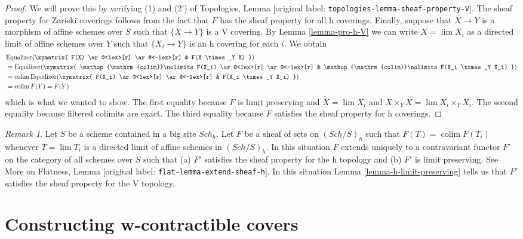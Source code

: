 \documentclass[10pt,a4paper]{article}
\theoremstyle{plain}
\theoremstyle{definition}
\theoremstyle{remark}
\newtheorem{remark}[subsection]{Remark}
\numberwithin{equation}{subsection}
\def\lim{\mathop{\mathrm{lim}}\nolimits}
\def\colim{\mathop{\mathrm{colim}}\nolimits}
\def\Sch{\mathit{Sch}}
\begin{document}
\begin{proof}
We will prove this by verifying (1) and (2') of
Topologies, Lemma \textnormal{[original label: \nolinkurl{topologies-lemma-sheaf-property-V}]}.
The sheaf property for Zariski coverings follows from
the fact that $F$ has the sheaf property for all h coverings.
Finally, suppose that $X \to Y$ is a morphism of affine schemes
over $S$ such that $\{X \to Y\}$ is a V covering.
By Lemma \ref{lemma-pro-h-V} we can write $X = \lim X_i$
as a directed limit of affine schemes
over $Y$ such that $\{X_i \to Y\}$ is an h covering for each $i$.
We obtain
\begin{align*}
&
\text{Equalizer}(
\xymatrix{
F(X) \ar@<1ex>[r] \ar@<-1ex>[r] &
F(X \times_Y X)
}
)
\\
& =
\text{Equalizer}(
\xymatrix{
\colim F(X_i) \ar@<1ex>[r] \ar@<-1ex>[r] &
\colim F(X_i \times_Y X_i)
}
)
\\
& =
\colim
\text{Equalizer}(
\xymatrix{
F(X_i) \ar@<1ex>[r] \ar@<-1ex>[r] &
F(X_i \times_Y X_i)
}
)
\\
& =
\colim F(Y) = F(Y)
\end{align*}
which is what we wanted to show.
The first equality because $F$ is limit preserving and $X = \lim X_i$ and
$X \times_Y X = \lim X_i \times_Y X_i$.
The second equality because filtered colimits are exact.
The third equality because $F$ satisfies the sheaf property
for h coverings.
\end{proof}

\begin{remark}
\label{remark-h-limit-preserving}
Let $S$ be a scheme contained in a big site $\Sch_h$. Let $F$ be a sheaf
of sets on $(\Sch/S)_h$ such that $F(T) = \colim F(T_i)$ whenever
$T = \lim T_i$ is a directed limit of affine schemes in $(\Sch/S)_h$.
In this situation $F$ extends uniquely to a contravariant functor $F'$
on the category of all schemes over $S$ such that (a) $F'$ satisfies the
sheaf property for the h topology and (b) $F'$ is limit preserving.
See More on Flatness, Lemma \textnormal{[original label: \nolinkurl{flat-lemma-extend-sheaf-h}]}.
In this situation Lemma \ref{lemma-h-limit-preserving}
tells us that $F'$ satisfies
the sheaf property for the V topology.
\end{remark}







\section{Constructing w-contractible covers}
\label{section-w-contractible}
\end{document}
